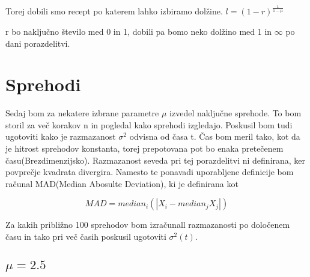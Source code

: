 \documentclass{article}
\begin{document}
Torej dobili smo recept po katerem lahko izbiramo dolžine.
$l =  (1-r)^{\frac{1}{1-\mu}}$

r bo naključno število med 0 in 1, dobili pa bomo neko dolžino med 1 in $\infty$ po dani porazdelitvi.

\section{Sprehodi}

Sedaj bom za nekatere izbrane parametre $\mu$ izvedel naključne sprehode. To bom storil za več korakov n in pogledal kako sprehodi izgledajo.
Poskusil bom tudi ugotoviti kako je razmazanost $\sigma^2$ odvisna od časa t. Čas bom meril tako, kot da je hitrost sprehodov konstanta, torej prepotovana pot bo enaka pretečenem času(Brezdimenzijsko). Razmazanost seveda pri tej porazdelitvi ni definirana, ker povprečje kvadrata
divergira. Namesto te ponavadi uporabljene definicije bom računal MAD(Median Abosulte Deviation), ki je definirana kot

\begin{equation*}
MAD= median_i(|X_i- median_jX_j|)
\end{equation*}

Za kakih približno 100 sprehodov bom izračunall razmazanosti po določenem času in tako pri več časih poskusil ugotoviti $\sigma^2(t)$.
\subsection{$\mu = 2.5$}
\end{document}
